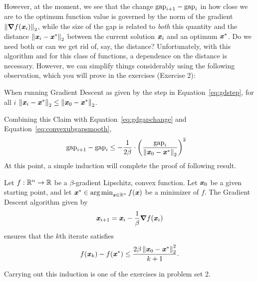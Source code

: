 However, at the moment, we see that the change $\text{gap}_{i+1}- \text{gap}_i$
in how close we are to the optimum function value is governed by the norm of the gradient $\left\| \boldsymbol{\nabla}
  f(\boldsymbol{\mathit{x}}_{i}) \right\|_2$, while the size of the gap is related to \emph{both}
this quantity and the distance $\left\| \boldsymbol{\mathit{x}}_i - \boldsymbol{\mathit{x}}^* \right\|_2$ between the
current solution $\boldsymbol{\mathit{x}}_i$ and an optimum $\boldsymbol{\mathit{x}}^*$.
Do we need both or can we get rid of, say, the distance?
Unfortunately, with this algorithm and for this class of functions, a
dependence on the distance is necessary.
However, we can simplify things considerably using the following
observation, which you will prove in the exercises (Exercise 2):
\begin{claim}
  \label{clm:gdoptdist}
  When running Gradient Descent as given by the step in
  Equation~\eqref{eq:gdstep},  for all $i$
  $\left\| \boldsymbol{\mathit{x}}_i - \boldsymbol{\mathit{x}}^* \right\|_2 \leq \left\| \boldsymbol{\mathit{x}}_0 - \boldsymbol{\mathit{x}}^* \right\|_2$.
\end{claim}
Combining this Claim with Equation~\eqref{eq:gdgapchange} and Equation~\eqref{eq:convexubgapsmooth},
\begin{align}
\label{eq:convexgapsmooth}
  \text{gap}_{i+1}- \text{gap}_i
  &\leq
    -
    \frac{1}{2\beta}
    \cdot
    \left(
    \frac{\text{gap}_i}{\left\| \boldsymbol{\mathit{x}}_0 - \boldsymbol{\mathit{x}}^* \right\|_2 }
    \right)^2
\end{align}
At this point, a simple induction will complete the proof of following result.
\begin{theorem}
  \label{thm:gdsmoothconv}
  Let $f : \mathbb{R}^n \to \mathbb{R}$ be a $\beta$-gradient Lipschitz, convex
  function.
  Let $\boldsymbol{\mathit{x}}_0$ be a given starting point,
  and let $\boldsymbol{\mathit{x}}^* \in \operatorname*{arg\,min}_{\boldsymbol{\mathit{x}} \in \mathbb{R}^n} f(\boldsymbol{\mathit{x}})$ be a minimizer of $f$.
 The Gradient Descent algorithm given by
  \[
   \boldsymbol{\mathit{x}}_{i+1} = \boldsymbol{\mathit{x}}_{i} - \frac{1}{\beta} \boldsymbol{\nabla} f(\boldsymbol{\mathit{x}}_{i})
 \]
 ensures that the $k$th iterate satisfies
 \[
   f(\boldsymbol{\mathit{x}}_{k}) - f(\boldsymbol{\mathit{x}}^*)\leq \frac{2\beta \left\| \boldsymbol{\mathit{x}}_0 - \boldsymbol{\mathit{x}}^* \right\|_2^2}{k+1}
   .
   \]
\end{theorem}
Carrying out this induction is one of the exercises in problem set 2.



